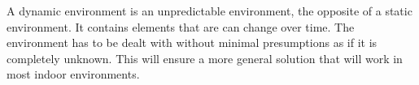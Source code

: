 A dynamic environment is an unpredictable environment, the opposite of a static environment. It contains elements that are can change over time. The environment has to be dealt with without minimal presumptions as if it is completely unknown. This will ensure a more general solution that will work in most indoor environments.